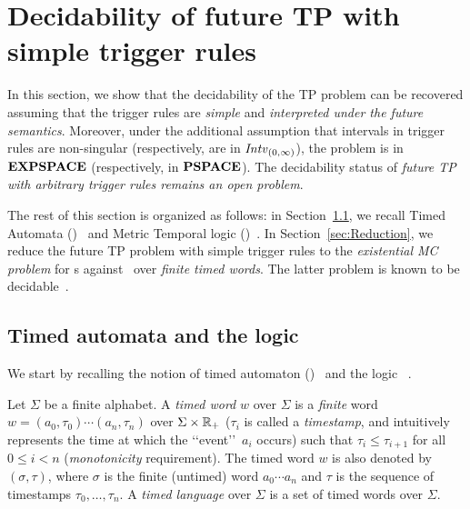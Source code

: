 \section{Decidability of future TP with simple trigger rules}\label{sec:DecisionProcedures}

In this section, we show that the decidability of the TP problem can be recovered assuming that the trigger rules are \emph{simple} and \emph{interpreted under the future semantics}. Moreover, under the additional assumption that intervals in trigger rules are non-singular (respectively, are in ${\mathit{Intv}}_{(0,\infty)}$), the problem is
in $\textbf{EXPSPACE}$ (respectively, in $\textbf{PSPACE}$). 
%
The decidability status of \emph{future TP with arbitrary trigger rules remains an open problem}.

The rest of this section is organized as follows: in Section~\ref{sec:TimedAutomata}, we recall Timed Automata (\TA)~\cite{ALUR1994183}  and Metric Temporal logic (\MTL)~\cite{Koymans90}. In Section~\ref{sec:Reduction}, we reduce the future TP problem
with simple trigger rules to the \emph{existential MC problem} for \TA s against \MTL\ over \emph{finite timed words}. The latter problem is known to be decidable~\cite{OuaknineW07}.


\subsection{Timed automata and the logic \MTL}\label{sec:TimedAutomata}

We start by recalling the notion of timed automaton (\TA)~\cite{ALUR1994183} and the logic \MTL~\cite{Koymans90}.

Let $\Sigma$ be a finite alphabet. A  \emph{timed word} $w$ over  $\Sigma$ is
a \emph{finite}  word $w=(a_0,\tau_0)\cdots (a_n,\tau_n)$ over $\Sigma\times {\mathbb{R}_+}$ %
($\tau_i$ is called a \emph{timestamp}, and intuitively represents the time at which the \lq\lq event\rq\rq\ $a_i$ occurs) such that  $\tau_{i}\leq \tau_{i+1}$ for all $0\leq i<n$ (\emph{monotonicity} requirement).
The timed word $w$ is also denoted by $(\sigma,\tau)$, where $\sigma$ is the finite (untimed) word $a_0 \cdots a_n$
and $\tau$ is the sequence of timestamps $\tau_0, \ldots, \tau_n$.
A \emph{timed language}  over $\Sigma$ is a set of timed words over $\Sigma$.%

